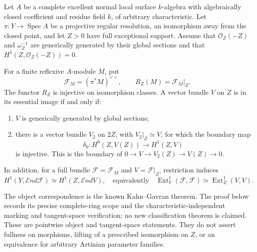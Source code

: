 \begin{theorem}
\label{D:reduction-cycle-full-module-correspondence}
Let $A$ be a complete excellent normal local surface $k$-algebra
with algebraically closed coefficient and residue field $k$,
of arbitrary characteristic. Let $\pi:Y\to\operatorname{Spec}A$
be a projective regular resolution, an isomorphism away from
the closed point, and let $Z>0$ have full exceptional support.
Assume that $\mathcal O_Z(-Z)$ and $\omega_Z^{-1}$ are
generically generated by their global sections and that
$H^1(Z,\mathcal O_Z(-Z))=0$.

For a finite reflexive $A$-module $M$, put
\[
       \mathcal F_M=(\pi^*M)^{\vee\vee},\qquad
       R_Z(M)=\mathcal F_M|_Z.
\]
The functor $R_Z$ is injective on isomorphism classes. A vector
bundle $V$ on $Z$ is in its essential image if and only if:
\begin{enumerate}
\item $V$ is generically generated by global sections;
\item there is a vector bundle $V_2$ on $2Z$, with
$V_2|_Z\simeq V$, for which the boundary map
\[
 \delta_0:H^0(Z,V(Z))\longrightarrow H^1(Z,V)
                                                        \tag{D.KR.6}
\]
is injective. This is the boundary of
$0\to V\to V_2(Z)\to V(Z)\to0$.
\end{enumerate}
In addition, for a full bundle $\mathcal F=\mathcal F_M$
and $V=\mathcal F|_Z$, restriction induces
\[
 H^1(Y,\mathcal End\mathcal F)
       \simeq H^1(Z,\mathcal End V),
 \quad\text{equivalently}\quad
 \operatorname{Ext}^1_Y(\mathcal F,\mathcal F)
       \simeq\operatorname{Ext}^1_Z(V,V).
                                                        \tag{D.KR.7}
\]

The object correspondence is the known Kahn--Gavran theorem.
The proof below records its precise complete-ring scope and the
characteristic-independent marking and tangent-space verification;
no new classification theorem is claimed.
These are pointwise object and tangent-space statements.
They do not assert fullness on morphisms, lifting of a
prescribed isomorphism on $Z$, or an equivalence for arbitrary
Artinian parameter families.
\end{theorem}


